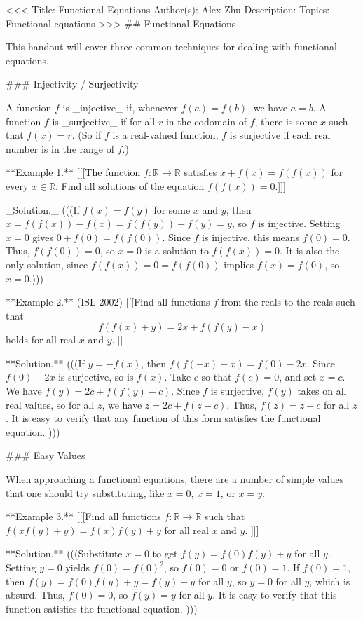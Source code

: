 <<<
Title: Functional Equations
Author(s): Alex Zhu
Description: 
Topics: Functional equations
>>>
## Functional Equations

This handout will cover three common techniques for dealing with functional equations. 


### Injectivity / Surjectivity

A function $f$ is _injective_ if, whenever $f(a) = f(b)$, we have $a = b$. A function $f$ is _surjective_ if for all $r$ in the codomain of $f$, there is some $x$ such that $f(x) = r$. (So if $f$ is a real-valued function, $f$ is surjective if each real number is in the range of $f$.)

**Example 1.** [[[The function $f : \mathbb{R} \to \mathbb{R}$ satisfies $x + f(x) = f(f(x))$ for every $x \in \mathbb{R}$. Find all solutions of the equation $f(f(x)) = 0$.]]]

_Solution._ (((If $f(x) = f(y)$ for some $x$ and $y$, then $x = f(f(x)) - f(x) = f(f(y)) - f(y) = y$, so $f$ is injective. Setting $x = 0$ gives $0 + f(0) = f(f(0))$. Since $f$ is injective, this means $f(0) = 0$. Thus, $f(f(0)) = 0$, so $x = 0$ is a solution to $f(f(x)) = 0$. It is also the only solution, since $f(f(x)) = 0 = f(f(0))$ implies $f(x) = f(0)$, so $x = 0$.)))

**Example 2.** (ISL 2002) [[[Find all functions $f$ from the reals to the reals such that 
  \[ f(f(x) + y) = 2x + f(f(y) - x) \]
  holds for all real $x$ and $y$.]]]

**Solution.** (((If $y = -f(x)$, then $f(f(-x) - x) = f(0) - 2x$. Since $f(0) - 2x$ is surjective, so is $f(x)$. Take $c$ so that $f(c) = 0$, and set $x = c$. We have $f(y) = 2c + f(f(y) - c)$. Since $f$ is surjective, $f(y)$ takes on all real values, so for all $z$, we have $z = 2c + f(z - c)$. Thus, $f(z) = z - c$ for all $z$. It is easy to verify that any function of this form satisfies the functional equation. )))

### Easy Values

When approaching a functional equations, there are a number of simple values that one should try substituting, like $x = 0$, $x = 1$, or $x = y$.

**Example 3.** [[[Find all functions $f : \mathbb{R} \to \mathbb{R}$ such that $f(xf(y)+y) = f(x)f(y) + y$ for all real $x$ and $y$. ]]]

**Solution.** (((Substitute $x = 0$ to get $f(y) = f(0)f(y) + y$ for all $y$. Setting $y = 0$ yields $f(0) = f(0)^2$, so $f(0) = 0$ or $f(0) = 1$. If $f(0) = 1$, then $f(y) = f(0)f(y) + y = f(y) + y$ for all $y$, so $y = 0$ for all $y$, which is absurd. Thus, $f(0) = 0$, so $f(y) = y$ for all $y$. It is easy to verify that this function satisfies the functional equation. )))

